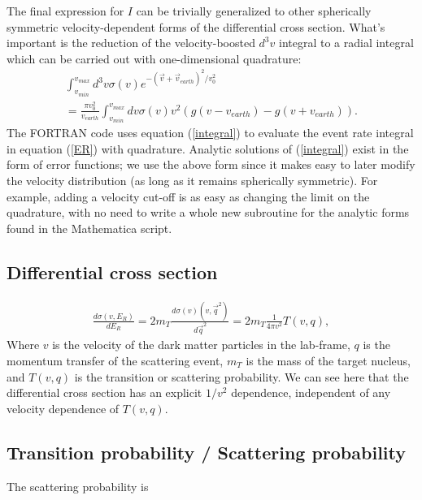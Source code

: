 \documentclass[
14pt, %
a4paper, %
oneside, %
headinclude,footinclude, %
BCOR5mm, %
]{scrartcl}
\begin{document}
The final expression for $I$ can be trivially generalized to other spherically
symmetric velocity-dependent forms of the differential cross section. What's 
important is the reduction of the velocity-boosted $d^3v$ integral to a radial 
integral which can be carried out with one-dimensional quadrature:
\begin{equation}\label{integral}
\begin{split}
\int_{v_{min}}^{v_{max}} d^3v \sigma(v) e^{-(\vec{v}+\vec{v}_{earth})^2/v_0^2}
\\
	= \frac{\pi v_0^2}{v_{earth} }\int_{v_{min}}^{v_{max}} dv \sigma(v) v^2\left( g(v-v_{earth}) - g(v+v_{earth}) \right).
\end{split}
\end{equation}
The FORTRAN code uses equation (\ref{integral}) to evaluate the event rate 
integral in equation (\ref{ER}) with quadrature. Analytic solutions of  
(\ref{integral}) exist in the form of error functions; we use the above form 
since it makes easy to later modify the velocity distribution (as long as it 
remains spherically symmetric). For example, adding a velocity cut-off is as 
easy as changing the limit on the quadrature, with no need to write a whole 
new subroutine for the analytic forms found in the Mathematica script.

\subsection{Differential cross section}\label{crosssection}
\begin{equation}
\begin{split}
\frac{d\sigma(v,E_R)}{dE_R} = 2m_T \frac{d\sigma(v)(v,\vec{q}^2)}{d\vec{q}^2} = 2m_T\frac{1}{4\pi v^2}T(v,q),
\end{split}
\end{equation}
Where $v$ is the velocity of the dark matter particles in the lab-frame, $q$ 
is the momentum transfer of the scattering event, $m_T$ is the mass of the 
target nucleus, and $T(v,q)$ is the transition or scattering probability. We 
can see here that the differential cross section has an explicit $1/v^2$ 
dependence, independent of any velocity dependence of $T(v,q)$.


\subsection{Transition probability / Scattering probability}

The scattering probability is
\end{document}
